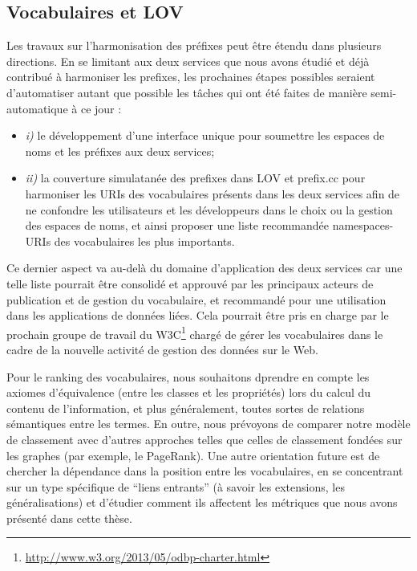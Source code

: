 \documentclass[a4paper,11pt,twoside]{report}
\begin{document}
\subsection*{Vocabulaires et LOV}
\label{sec:nextSteps}
Les travaux sur l'harmonisation des préfixes peut être étendu dans plusieurs directions. En se limitant aux deux services que nous avons étudié et déjà contribué à harmoniser les prefixes, les prochaines étapes possibles seraient d'automatiser autant que possible les tâches qui ont été faites de manière semi-automatique à ce jour :
\begin{itemize}
 \item \emph{i)} le développement d'une interface unique pour soumettre les espaces de noms et les préfixes aux deux services;
 \item \emph{ii)} la couverture simulatanée des prefixes dans LOV et prefix.cc pour harmoniser les URIs des vocabulaires présents dans les deux services afin de ne confondre les utilisateurs et les développeurs dans le choix ou la gestion des espaces de noms, et ainsi proposer une liste recommandée namespaces-URIs des vocabulaires les plus importants.
\end{itemize}

Ce dernier aspect va au-delà du domaine d'application des deux services car une telle liste pourrait être consolidé et approuvé par les principaux acteurs de publication et de gestion du vocabulaire, et recommandé pour une utilisation dans les applications de données liées. Cela pourrait être pris en charge par le prochain groupe de travail du W3C\footnote{\url{http://www.w3.org/2013/05/odbp-charter.html}} chargé de gérer les vocabulaires dans le cadre de la nouvelle activité de gestion des données sur le Web.

Pour le ranking des vocabulaires, nous souhaitons dprendre en compte les axiomes d'équivalence (entre les classes et les propriétés) lors du calcul du contenu de l'information, et plus généralement, toutes sortes de relations sémantiques entre les termes. En outre, nous prévoyons de comparer notre modèle de classement avec d'autres approches telles que celles de classement fondées sur les graphes  (par exemple, le PageRank). Une autre orientation future est de chercher la dépendance dans la position entre les vocabulaires, en se concentrant sur un type spécifique de ``liens entrants'' (à savoir les extensions, les généralisations) et d'étudier comment ils affectent les métriques que nous avons présenté dans cette thèse.
\end{document}
